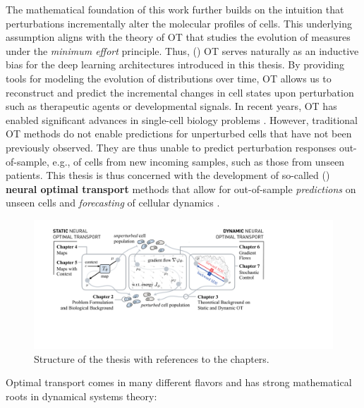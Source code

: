 The mathematical foundation of this work further builds on the intuition that perturbations incrementally alter the molecular profiles of cells. This underlying assumption aligns with the theory of \acrfull{OT} that studies the evolution of measures under the \emph{minimum effort} principle. Thus, () OT serves naturally as an inductive bias for the deep learning architectures introduced in this thesis.
By providing tools for modeling the evolution of distributions over time, OT allows us to reconstruct and predict the incremental changes in cell states upon perturbation such as therapeutic agents or developmental signals. 
In recent years, OT has enabled significant advances in single-cell biology problems \citep{schiebinger2019optimal, lavenant2021towards, demetci2022scot}. However, traditional OT methods do not enable predictions for unperturbed cells that have not been previously observed.
They are thus unable to predict perturbation responses out-of-sample, e.g., of cells from new incoming samples, such as those from unseen patients. 
This thesis is thus concerned with the development of so-called  () \textbf{neural optimal transport} methods that allow for out-of-sample \emph{predictions} on unseen cells and \emph{forecasting} of cellular dynamics \citep{makkuva2020optimal, tong2020trajectorynet,  korotin2021wasserstein, bunne2022proximal, bunne2022supervised, bunne2021learning}. \\

\begin{figure}[t]
  \includegraphics[width=\textwidth]{figures/fig_overview_thesis.pdf}
  \caption{Structure of the thesis with references to the chapters.}
  \label{fig:overview_thesis}
\end{figure}

Optimal transport comes in many different flavors and has strong mathematical roots in dynamical systems theory:

